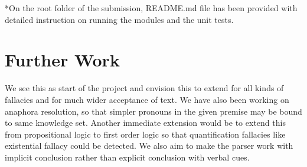 \documentclass[14pt, english]{article}
\begin{document}
\medskip{}


{*}On the root folder of the submission, README.md file has been provided
with detailed instruction on running the modules and the unit tests.


\section{Further Work}

We see this as start of the project and envision this to extend for
all kinds of fallacies and for much wider acceptance of text. We have
also been working on anaphora resolution, so that simpler pronouns
in the given premise may be bound to same knowledge set. Another immediate
extension would be to extend this from propositional logic to first
order logic so that quantification fallacies like existential fallacy
could be detected. We also aim to make the parser work with implicit
conclusion rather than explicit conclusion with verbal cues. 
\end{document}
